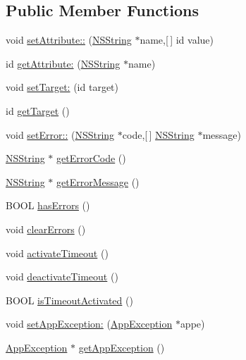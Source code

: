 \subsection*{\-Public \-Member \-Functions}
\begin{DoxyCompactItemize}
\item 
void \hyperlink{interface_command_context_a0b8bd20fcb252ddf29e9d9dae283c74c}{set\-Attribute\-::} (\hyperlink{class_n_s_string}{\-N\-S\-String} $\ast$name,\mbox{[}$\,$\mbox{]} id value)
\item 
id \hyperlink{interface_command_context_a3a47d7b68985f7fef98aad713daa5d6f}{get\-Attribute\-:} (\hyperlink{class_n_s_string}{\-N\-S\-String} $\ast$name)
\item 
void \hyperlink{interface_command_context_a4843201ab3232a624cc001600d9dd551}{set\-Target\-:} (id target)
\item 
id \hyperlink{interface_command_context_a0a098f39f68014cb11a72a838e5f6f81}{get\-Target} ()
\item 
void \hyperlink{interface_command_context_aa62fb99118c778cc08c7b72b27d77647}{set\-Error\-::} (\hyperlink{class_n_s_string}{\-N\-S\-String} $\ast$code,\mbox{[}$\,$\mbox{]} \hyperlink{class_n_s_string}{\-N\-S\-String} $\ast$message)
\item 
\hyperlink{class_n_s_string}{\-N\-S\-String} $\ast$ \hyperlink{interface_command_context_aa2a78fb1ffdb86f1037426f7e570ed76}{get\-Error\-Code} ()
\item 
\hyperlink{class_n_s_string}{\-N\-S\-String} $\ast$ \hyperlink{interface_command_context_aa553ae8eb3a85f7cfc5756866ced48a5}{get\-Error\-Message} ()
\item 
\-B\-O\-O\-L \hyperlink{interface_command_context_afb6922cbed9d44144ccfc5755b8add65}{has\-Errors} ()
\item 
void \hyperlink{interface_command_context_a825e3480a67375607d283ee875199745}{clear\-Errors} ()
\item 
void \hyperlink{interface_command_context_a2c6073266e4ec22ac6b6227ce56e2bd6}{activate\-Timeout} ()
\item 
void \hyperlink{interface_command_context_a7c19633dd9421913e6a63078150583c8}{deactivate\-Timeout} ()
\item 
\-B\-O\-O\-L \hyperlink{interface_command_context_a5f72d0c0ca42b8502fa2580acbf62204}{is\-Timeout\-Activated} ()
\item 
void \hyperlink{interface_command_context_a489082496684047d76503079a74eac3e}{set\-App\-Exception\-:} (\hyperlink{interface_app_exception}{\-App\-Exception} $\ast$appe)
\item 
\hyperlink{interface_app_exception}{\-App\-Exception} $\ast$ \hyperlink{interface_command_context_a384335d72d424590c7e98f23b97bcc00}{get\-App\-Exception} ()
\end{DoxyCompactItemize}
